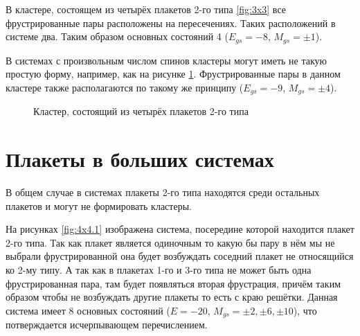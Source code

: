 \documentclass[utf8, babel, sor, jor, amsmath, amssymb, reprint]{elsarticle} %
\begin{document}
В кластере, состоящем из четырёх плакетов 2-го типа \ref{fig:3x3} все фрустрированные пары расположены на пересечениях. Таких расположений в системе два. Таким образом основных состояний 4 ($E_{gs}=-8$, $M_{gs}=\pm 1$).

В системах с произвольным числом спинов кластеры могут иметь не такую простую форму, например, как на рисунке \ref{fig:cl}. Фрустрированные пары в данном кластере также располагаются по такому же принципу ($E_{gs}=-9$, $M_{gs}=\pm 4$).

\begin{figure}[H]
	\centering
	\caption{Кластер, состоящий из четырёх плакетов 2-го типа}
	\label{fig:cl}
\end{figure}

\section{Плакеты в больших системах}

В общем случае в системах плакеты 2-го типа находятся среди остальных плакетов и могут не формировать кластеры.

На рисунках \ref{fig:4x4.1} изображена система, посередине которой находится плакет 2-го типа. Так как плакет является одиночным то какую бы пару в нём мы не выбрали фрустрированной она будет возбуждать соседний плакет не относящийся ко 2-му типу. А так как в плакетах 1-го и 3-го типа не может быть одна фрустрированная пара, там будет появляться вторая фрустрация, причём таким образом чтобы не возбуждать другие плакеты то есть с краю решётки. Данная система имеет 8 основных состояний ($E=-20$, $M_{gs}=\pm 2, \pm 6, \pm 10$), что потверждается исчерпывающем перечислением.
\end{document}
